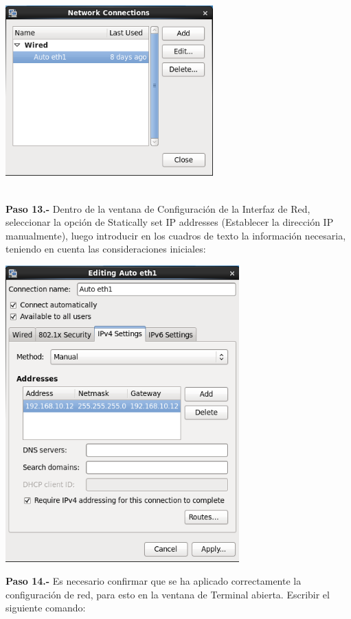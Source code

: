 \begin{enumerate}
\begin{center}
  \includegraphics[width=8cm]{Imagenes/Oracle_Database/Paso_12.png}
\end{center}
\vspace{12pt}\\

\textbf {Paso 13.-} Dentro de la ventana de Configuración de la Interfaz de Red, seleccionar la opción de Statically set IP addresses (Establecer la dirección IP manualmente), luego introducir en los cuadros de texto la información necesaria, teniendo en cuenta las consideraciones iniciales:

\begin{center}
  \includegraphics[width=9cm]{Imagenes/Oracle_Database/Paso_13.png}
\end{center}
\break

\textbf {Paso 14.-} Es necesario confirmar que se ha aplicado correctamente la configuración de red, para esto en la ventana de Terminal abierta. Escribir el siguiente comando:


\end{enumerate}
